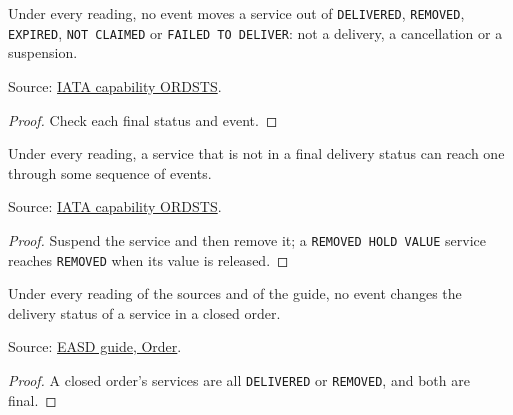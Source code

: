 \begin{theorem}
  \label{thm:delivery-final-refuses}
  Under every reading, no event moves a service out of \texttt{DELIVERED},
  \texttt{REMOVED}, \texttt{EXPIRED}, \texttt{NOT CLAIMED} or
  \texttt{FAILED TO DELIVER}: not a delivery, a cancellation or a
  suspension.

  Source: \href{https://retailing.iata.org/armi/docs/ORDSTS/}{IATA capability ORDSTS}.
\end{theorem}
\begin{proof}
  Check each final status and event.
\end{proof}

\begin{theorem}
  \label{thm:delivery-final-reachable}
  Under every reading, a service that is not in a final delivery status can
  reach one through some sequence of events.

  Source: \href{https://retailing.iata.org/armi/docs/ORDSTS/}{IATA capability ORDSTS}.
\end{theorem}
\begin{proof}
  Suspend the service and then remove it; a \texttt{REMOVED HOLD VALUE}
  service reaches \texttt{REMOVED} when its value is released.
\end{proof}

\begin{theorem}
  \label{thm:delivery-closed-order-refuses}
  Under every reading of the sources and of the guide, no event changes the
  delivery status of a service in a closed order.

  Source: \href{https://standards.atlassian.net/wiki/spaces/EASD/pages/574849062/Order}{EASD guide, Order}.
\end{theorem}
\begin{proof}
  A closed order's services are all \texttt{DELIVERED} or \texttt{REMOVED},
  and both are final.
\end{proof}

